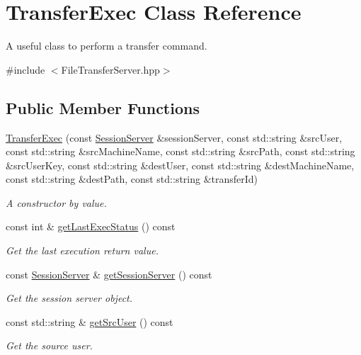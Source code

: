 \hypertarget{classTransferExec}{
\section{TransferExec Class Reference}
\label{classTransferExec}
}


A useful class to perform a transfer command.  




{\ttfamily \#include $<$FileTransferServer.hpp$>$}

\subsection*{Public Member Functions}
\begin{DoxyCompactItemize}
\item 
\hyperlink{classTransferExec_a0afdf6581b6d116af3de73f974495225}{TransferExec} (const \hyperlink{classSessionServer}{SessionServer} \&sessionServer, const std::string \&srcUser, const std::string \&srcMachineName, const std::string \&srcPath, const std::string \&srcUserKey, const std::string \&destUser, const std::string \&destMachineName, const std::string \&destPath, const std::string \&transferId)
\begin{DoxyCompactList}\small\item\em A constructor by value. \item\end{DoxyCompactList}\item 
const int \& \hyperlink{classTransferExec_a070847f49ab5d470cac426008bc39071}{getLastExecStatus} () const 
\begin{DoxyCompactList}\small\item\em Get the last execution return value. \item\end{DoxyCompactList}\item 
const \hyperlink{classSessionServer}{SessionServer} \& \hyperlink{classTransferExec_a237bc0bbb31f9d96df632b095d85ba6a}{getSessionServer} () const 
\begin{DoxyCompactList}\small\item\em Get the session server object. \item\end{DoxyCompactList}\item 
const std::string \& \hyperlink{classTransferExec_aad69ff9ce3ed081962399adcbe423917}{getSrcUser} () const 
\begin{DoxyCompactList}\small\item\em Get the source user. \item\end{DoxyCompactList}\item 

\end{DoxyCompactItemize}
